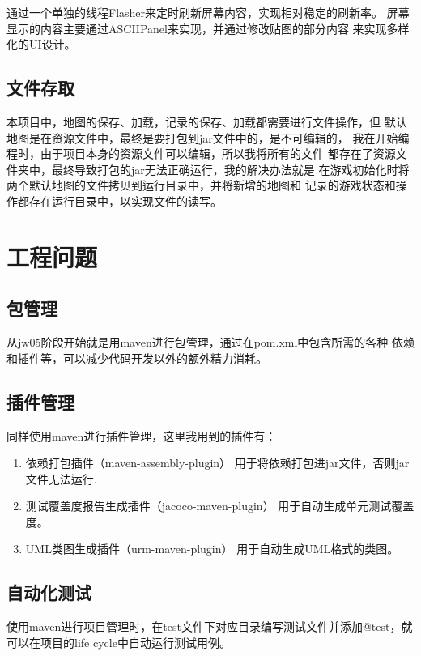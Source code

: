\documentclass{SCIS2022cn}
\begin{document}
通过一个单独的线程Flasher来定时刷新屏幕内容，实现相对稳定的刷新率。
屏幕显示的内容主要通过ASCIIPanel来实现，并通过修改贴图的部分内容
来实现多样化的UI设计。

\subsection{文件存取}

本项目中，地图的保存、加载，记录的保存、加载都需要进行文件操作，但
默认地图是在资源文件中，最终是要打包到jar文件中的，是不可编辑的，
我在开始编程时，由于项目本身的资源文件可以编辑，所以我将所有的文件
都存在了资源文件夹中，最终导致打包的jar无法正确运行，我的解决办法就是
在游戏初始化时将两个默认地图的文件拷贝到运行目录中，并将新增的地图和
记录的游戏状态和操作都存在运行目录中，以实现文件的读写。

\section{工程问题}

\subsection{包管理}

从jw05阶段开始就是用maven进行包管理，通过在pom.xml中包含所需的各种
依赖和插件等，可以减少代码开发以外的额外精力消耗。

\subsection{插件管理}

同样使用maven进行插件管理，这里我用到的插件有：

\begin{enumerate}
    \item 依赖打包插件（maven-assembly-plugin）
    用于将依赖打包进jar文件，否则jar文件无法运行.
    \item 测试覆盖度报告生成插件（jacoco-maven-plugin）
    用于自动生成单元测试覆盖度。
    \item UML类图生成插件（urm-maven-plugin）
    用于自动生成UML格式的类图。
\end{enumerate}

\subsection{自动化测试}

使用maven进行项目管理时，在test文件下对应目录编写测试文件并添加@test，就
可以在项目的life cycle中自动运行测试用例。
\end{document}
